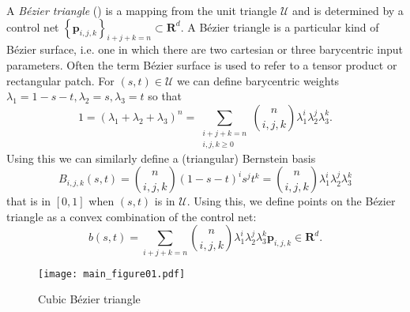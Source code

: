 \documentclass[oneside, reqno]{amsart}
\theoremstyle{definition}
\newcommand{\reals}{\mathbf{R}}
\newcommand{\utri}{\mathcal{U}}
\begin{document}
A \emph{B\'{e}zier triangle} (\cite[Chapter~17]{Farin2001}) is a
mapping from the unit triangle
\(\utri\) and is determined by a control net
\(\left\{\bm{p}_{i, j, k}\right\}_{i + j + k = n} \subset \reals^d\).
A B\'{e}zier triangle is a particular kind of B\'{e}zier surface, i.e. one
in which there are two cartesian or three barycentric input parameters.
Often the term B\'{e}zier surface is used to refer to a tensor product or
rectangular patch.
For \((s, t) \in \utri\) we can define barycentric weights
\(\lambda_1 = 1 - s - t, \lambda_2 = s, \lambda_3 = t\) so that
\begin{equation}
1 = \left(\lambda_1 + \lambda_2 + \lambda_3\right)^n =
  \sum_{\substack{i + j + k = n \\ i, j, k \geq 0}} \binom{n}{i, j, k}
  \lambda_1^i \lambda_2^j \lambda_3^k.
\end{equation}
Using this we can similarly define a (triangular) Bernstein basis
\begin{equation}
B_{i, j, k}(s, t) = \binom{n}{i, j, k} (1 - s - t)^i s^j t^k
  = \binom{n}{i, j, k} \lambda_1^i \lambda_2^j \lambda_3^k
\end{equation}
that is in \(\left[0, 1\right]\) when \((s, t)\) is in \(\utri\).
Using this, we define points on the B\'{e}zier triangle as a
convex combination of the control net:
\begin{equation}
b(s, t) = \sum_{i + j + k = n} \binom{n}{i, j, k}
  \lambda_1^i \lambda_2^j \lambda_3^k
  \bm{p}_{i, j, k} \in \reals^d.
\end{equation}

\begin{figure}
  \texttt{[image: main\_figure01.pdf]}
  \centering
  \captionsetup{width=.75\linewidth}
  \caption{Cubic B\'{e}zier triangle}
  \label{fig:cubic-bezier-example}
\end{figure}
\end{document}
